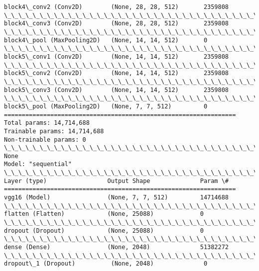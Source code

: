 \documentclass[11pt]{article}
\begin{document}
\begin{Verbatim}[commandchars=\\\{\}]
block4\_conv2 (Conv2D)        (None, 28, 28, 512)       2359808
\_\_\_\_\_\_\_\_\_\_\_\_\_\_\_\_\_\_\_\_\_\_\_\_\_\_\_\_\_\_\_\_\_\_\_\_\_\_\_\_\_\_\_\_\_\_\_\_\_\_\_\_\_\_\_\_\_\_\_\_\_\_\_\_\_
block4\_conv3 (Conv2D)        (None, 28, 28, 512)       2359808
\_\_\_\_\_\_\_\_\_\_\_\_\_\_\_\_\_\_\_\_\_\_\_\_\_\_\_\_\_\_\_\_\_\_\_\_\_\_\_\_\_\_\_\_\_\_\_\_\_\_\_\_\_\_\_\_\_\_\_\_\_\_\_\_\_
block4\_pool (MaxPooling2D)   (None, 14, 14, 512)       0
\_\_\_\_\_\_\_\_\_\_\_\_\_\_\_\_\_\_\_\_\_\_\_\_\_\_\_\_\_\_\_\_\_\_\_\_\_\_\_\_\_\_\_\_\_\_\_\_\_\_\_\_\_\_\_\_\_\_\_\_\_\_\_\_\_
block5\_conv1 (Conv2D)        (None, 14, 14, 512)       2359808
\_\_\_\_\_\_\_\_\_\_\_\_\_\_\_\_\_\_\_\_\_\_\_\_\_\_\_\_\_\_\_\_\_\_\_\_\_\_\_\_\_\_\_\_\_\_\_\_\_\_\_\_\_\_\_\_\_\_\_\_\_\_\_\_\_
block5\_conv2 (Conv2D)        (None, 14, 14, 512)       2359808
\_\_\_\_\_\_\_\_\_\_\_\_\_\_\_\_\_\_\_\_\_\_\_\_\_\_\_\_\_\_\_\_\_\_\_\_\_\_\_\_\_\_\_\_\_\_\_\_\_\_\_\_\_\_\_\_\_\_\_\_\_\_\_\_\_
block5\_conv3 (Conv2D)        (None, 14, 14, 512)       2359808
\_\_\_\_\_\_\_\_\_\_\_\_\_\_\_\_\_\_\_\_\_\_\_\_\_\_\_\_\_\_\_\_\_\_\_\_\_\_\_\_\_\_\_\_\_\_\_\_\_\_\_\_\_\_\_\_\_\_\_\_\_\_\_\_\_
block5\_pool (MaxPooling2D)   (None, 7, 7, 512)         0
=================================================================
Total params: 14,714,688
Trainable params: 14,714,688
Non-trainable params: 0
\_\_\_\_\_\_\_\_\_\_\_\_\_\_\_\_\_\_\_\_\_\_\_\_\_\_\_\_\_\_\_\_\_\_\_\_\_\_\_\_\_\_\_\_\_\_\_\_\_\_\_\_\_\_\_\_\_\_\_\_\_\_\_\_\_
None
Model: "sequential"
\_\_\_\_\_\_\_\_\_\_\_\_\_\_\_\_\_\_\_\_\_\_\_\_\_\_\_\_\_\_\_\_\_\_\_\_\_\_\_\_\_\_\_\_\_\_\_\_\_\_\_\_\_\_\_\_\_\_\_\_\_\_\_\_\_
Layer (type)                 Output Shape              Param \#
=================================================================
vgg16 (Model)                (None, 7, 7, 512)         14714688
\_\_\_\_\_\_\_\_\_\_\_\_\_\_\_\_\_\_\_\_\_\_\_\_\_\_\_\_\_\_\_\_\_\_\_\_\_\_\_\_\_\_\_\_\_\_\_\_\_\_\_\_\_\_\_\_\_\_\_\_\_\_\_\_\_
flatten (Flatten)            (None, 25088)             0
\_\_\_\_\_\_\_\_\_\_\_\_\_\_\_\_\_\_\_\_\_\_\_\_\_\_\_\_\_\_\_\_\_\_\_\_\_\_\_\_\_\_\_\_\_\_\_\_\_\_\_\_\_\_\_\_\_\_\_\_\_\_\_\_\_
dropout (Dropout)            (None, 25088)             0
\_\_\_\_\_\_\_\_\_\_\_\_\_\_\_\_\_\_\_\_\_\_\_\_\_\_\_\_\_\_\_\_\_\_\_\_\_\_\_\_\_\_\_\_\_\_\_\_\_\_\_\_\_\_\_\_\_\_\_\_\_\_\_\_\_
dense (Dense)                (None, 2048)              51382272
\_\_\_\_\_\_\_\_\_\_\_\_\_\_\_\_\_\_\_\_\_\_\_\_\_\_\_\_\_\_\_\_\_\_\_\_\_\_\_\_\_\_\_\_\_\_\_\_\_\_\_\_\_\_\_\_\_\_\_\_\_\_\_\_\_
dropout\_1 (Dropout)          (None, 2048)              0

\end{Verbatim}
\end{document}
